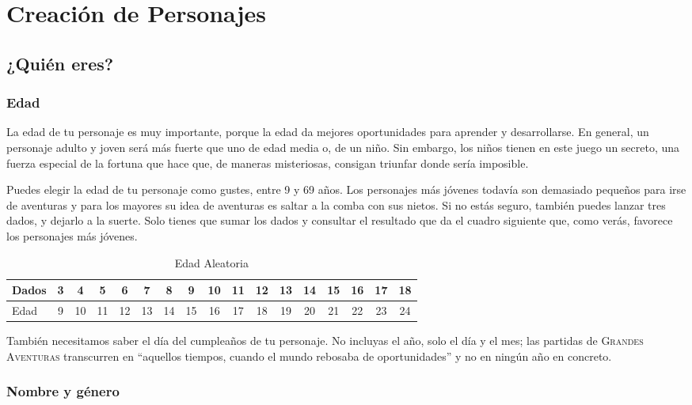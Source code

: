 \chapter{Creación de Personajes}

\section{¿Quién eres?}

\subsection{Edad}

La edad de tu personaje es muy importante, porque la edad da mejores oportunidades para aprender y desarrollarse. En general, un personaje adulto y joven será más fuerte que uno de edad media o, de un niño. Sin embargo, los niños tienen en este juego un secreto, una fuerza especial de la fortuna que hace que, de maneras misteriosas, consigan triunfar donde sería imposible. 

Puedes elegir la edad de tu personaje como gustes, entre 9 y 69 años. Los personajes más jóvenes todavía son demasiado pequeños para irse de aventuras y para los mayores su idea de aventuras es saltar a la comba con sus nietos. Si no estás seguro, también puedes lanzar tres dados, y dejarlo a la suerte. Solo tienes que sumar los dados y consultar el resultado que da el cuadro siguiente que, como verás, favorece los personajes más jóvenes.

\begin{table}[h]
\footnotesize
\begin{tabular}{lcccccccccccccccc}
\toprule
Dados&3&4&5&6&7&8&9&10&11&12&13&14&15&16&17&18\\\midrule
Edad&9&10&11&12&13&14&15&16&17&18&19&20&21&22&23&24\\\midrule
\bottomrule
\end{tabular}
\caption{Edad Aleatoria}
\end{table}

También necesitamos saber el día del cumpleaños de tu personaje. No incluyas el año, solo el día y el mes; las partidas de \textsc{Grandes Aventuras} transcurren en \enquote{aquellos tiempos, cuando el mundo rebosaba de oportunidades} y no en ningún año en concreto.

\subsection{Nombre y género}

